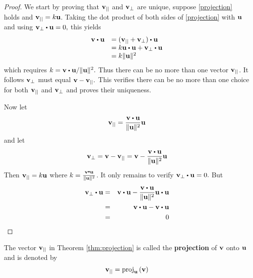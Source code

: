 \begin{proof}
We start by proving that ${\bf v}_{||}$ and ${\bf v}_{\bot}$ are unique, suppose \ref{projection} holds and ${\bf v}_{||}= k {\bf u}$.
 Taking the dot product of both sides of \ref{projection} with ${\bf u}$ and using $\vect{v}_{\bot }\dotprod \vect{u}=0,$
 this yields
\begin{equation*}
\begin{array}{ll}
\vect{v}\dotprod \vect{u} & = ( \vect{v}_{||}+\vect{v}_{\bot }) \dotprod \vect{u} \\
& =  k\vect{u} \dotprod \vect{u} + \vect{v}_{\bot} \dotprod \vect{u} \\
& = k \norm{\vect{u}} ^{2}
\end{array}
\end{equation*}
which requires $k =\vect{v}\dotprod \vect{u} / \norm{\vect{u}} ^{2}.$
Thus there can be no more than one vector ${\bf v}_{||}$. It follows 
${\bf v}_{\bot }$ must equal ${\bf v}-{\bf v}_{||}.$ This verifies there can
be no more than one choice for both ${\bf v}_{||}$ and ${\bf v}_{\bot
}$ and proves their uniqueness. 

Now let
\begin{equation*}
\vect{v}_{||} = 
\frac{\vect{v}\dotprod \vect{u}}{\norm{\vect{u}} ^{2}}\vect{u}
\end{equation*}
and let
\begin{equation*}
\vect{v}_{\bot }=\vect{v}-\vect{v}_{||}=\vect{v}-\frac{\vect{v}\dotprod \vect{u}}
{\norm{\vect{u}} ^{2}}\vect{u}
\end{equation*}
Then ${\bf v}_{||}= k{\bf u}$ where $k =\frac{\vect{v}\dotprod \vect{u}}{\norm{\vect{u}} ^{2}}$.
 It only remains to
verify $\vect{v}_{\bot }\dotprod \vect{u}=0.$ But
\begin{eqnarray*}
\vect{v}_{\bot }\dotprod \vect{u} &=& \vect{v}\dotprod \vect{u}-\frac{\vect{v}\dotprod \vect{u}}{\norm{\vect{u}} ^{2}}\vect{u}\dotprod \vect{u} \\
&=& \vect{v}\dotprod\vect{u}-\vect{v}\dotprod \vect{u}\\
&=& 0 
\end{eqnarray*}
\end{proof}

The vector ${\bf v}_{||}$ in Theorem \ref{thm:projection} is called the \textbf{projection}
of ${\bf v}$ onto ${\bf u}$ and is denoted by
\begin{equation*}
{\bf v}_{||}
=
\mbox{proj}_{{\bf u}}\left({\bf v}\right)
\end{equation*}

